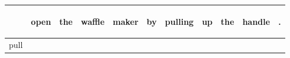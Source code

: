 \documentclass[landscape]{article}
\newcommand{\ssp}{\hspace{2pt}}
\begin{document}
\noindent\begin{tabular}{|l|p{10pt}|p{10pt}|p{10pt}|p{10pt}|p{10pt}|p{10pt}|p{10pt}|p{10pt}|p{10pt}|p{10pt}|}
\hline
&\begin{sideways}\cellcolor{ref0}open\hspace{12pt}\end{sideways}&\begin{sideways}\cellcolor{ref1}the\hspace{12pt}\end{sideways}&\begin{sideways}\cellcolor{ref2}waffle\hspace{12pt}\end{sideways}&\begin{sideways}\cellcolor{ref3}maker\hspace{12pt}\end{sideways}&\begin{sideways}\cellcolor{ref4}by\hspace{12pt}\end{sideways}&\begin{sideways}\cellcolor{ref5}pulling\hspace{12pt}\end{sideways}&\begin{sideways}\cellcolor{ref6}up\hspace{12pt}\end{sideways}&\begin{sideways}\cellcolor{ref7}the\hspace{12pt}\end{sideways}&\begin{sideways}\cellcolor{ref8}handle\hspace{12pt}\end{sideways}&\begin{sideways}\cellcolor{ref9}.\hspace{12pt}\end{sideways}\\
\hline
\ssp pull \ssp&\hspace{2pt}&\hspace{2pt}&\hspace{2pt}&\hspace{2pt}&\hspace{2pt}&\hspace{2pt}&\hspace{2pt}&\hspace{2pt}&\hspace{2pt}&\hspace{2pt}\\

\end{tabular}
\end{document}
